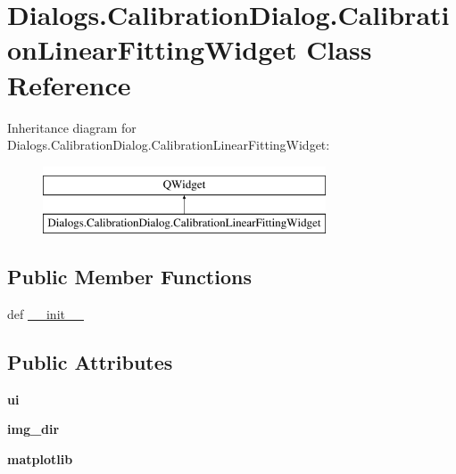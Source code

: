 \hypertarget{classDialogs_1_1CalibrationDialog_1_1CalibrationLinearFittingWidget}{\section{Dialogs.\-Calibration\-Dialog.\-Calibration\-Linear\-Fitting\-Widget Class Reference}
\label{classDialogs_1_1CalibrationDialog_1_1CalibrationLinearFittingWidget}
}
Inheritance diagram for Dialogs.\-Calibration\-Dialog.\-Calibration\-Linear\-Fitting\-Widget\-:\begin{figure}[H]
\begin{center}
\leavevmode
\includegraphics[height=2.000000cm]{classDialogs_1_1CalibrationDialog_1_1CalibrationLinearFittingWidget}
\end{center}
\end{figure}
\subsection*{Public Member Functions}
\begin{DoxyCompactItemize}
\item 
def \hyperlink{classDialogs_1_1CalibrationDialog_1_1CalibrationLinearFittingWidget_a0e2b28d1e603e4932aa85e4ca730247f}{\-\_\-\-\_\-init\-\_\-\-\_\-}
\end{DoxyCompactItemize}
\subsection*{Public Attributes}
\begin{DoxyCompactItemize}
\item 
\hypertarget{classDialogs_1_1CalibrationDialog_1_1CalibrationLinearFittingWidget_a914316b12db2f341067a6fe287159bb8}{{\bfseries ui}}\label{classDialogs_1_1CalibrationDialog_1_1CalibrationLinearFittingWidget_a914316b12db2f341067a6fe287159bb8}

\item 
\hypertarget{classDialogs_1_1CalibrationDialog_1_1CalibrationLinearFittingWidget_afc2b3b32f0770758bddf99e17289259e}{{\bfseries img\-\_\-dir}}\label{classDialogs_1_1CalibrationDialog_1_1CalibrationLinearFittingWidget_afc2b3b32f0770758bddf99e17289259e}

\item 
\hypertarget{classDialogs_1_1CalibrationDialog_1_1CalibrationLinearFittingWidget_a3eaebbfa5e145bc190141628ff7f6d63}{{\bfseries matplotlib}}\label{classDialogs_1_1CalibrationDialog_1_1CalibrationLinearFittingWidget_a3eaebbfa5e145bc190141628ff7f6d63}

\end{DoxyCompactItemize}


